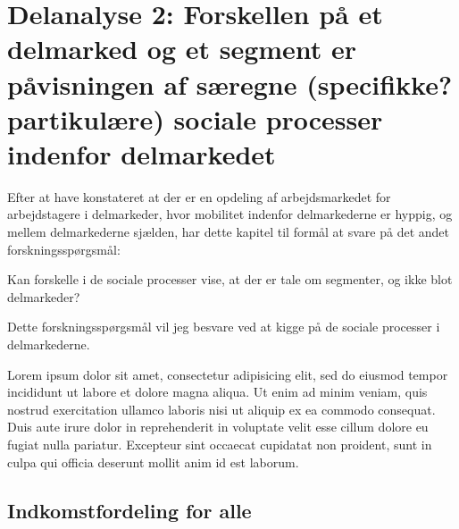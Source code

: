 

\chapter{Delanalyse 2: Forskellen på et delmarked og et segment er påvisningen af særegne (specifikke? partikulære) sociale processer indenfor delmarkedet \label{kapitel_delanalyse2_socialeprocesser}}

Efter at have konstateret at der er en opdeling af arbejdsmarkedet for arbejdstagere i delmarkeder, hvor mobilitet indenfor delmarkederne er hyppig, og mellem delmarkederne sjælden, har dette kapitel til formål at svare på det andet forskningsspørgsmål:

\begin{tcolorbox}[title=Forskningspørgsmål,
subtitle style={boxrule=0.4pt} ]
   Kan forskelle i de sociale processer vise, at der er tale om segmenter, og ikke blot delmarkeder?
\end{tcolorbox}

Dette forskningsspørgsmål vil jeg besvare ved at kigge på de sociale processer i delmarkederne.

Lorem ipsum dolor sit amet, consectetur adipisicing elit, sed do eiusmod
tempor incididunt ut labore et dolore magna aliqua. Ut enim ad minim veniam,
quis nostrud exercitation ullamco laboris nisi ut aliquip ex ea commodo
consequat. Duis aute irure dolor in reprehenderit in voluptate velit esse
cillum dolore eu fugiat nulla pariatur. Excepteur sint occaecat cupidatat non
proident, sunt in culpa qui officia deserunt mollit anim id est laborum.



\section{Indkomstfordeling for alle \label{sec_delanalyse2_loen_alle}}



